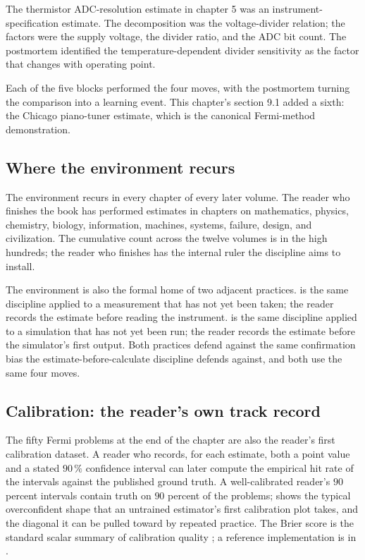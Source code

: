 The thermistor ADC-resolution estimate in chapter 5 was an
instrument-specification estimate. The decomposition was the
voltage-divider relation; the factors were the supply voltage,
the divider ratio, and the ADC bit count. The postmortem
identified the temperature-dependent divider sensitivity as the
factor that changes with operating point.

Each of the five blocks performed the four moves, with the
postmortem turning the comparison into a learning event. This
chapter's section 9.1 added a sixth: the Chicago piano-tuner
estimate, which is the canonical Fermi-method demonstration.

\subsection{Where the environment recurs}

The environment recurs in every chapter of every later volume. The
reader who finishes the book has performed estimates in chapters on
mathematics, physics, chemistry, biology, information, machines,
systems, failure, design, and civilization. The cumulative count
across the twelve volumes is in the high hundreds; the reader who
finishes has the internal ruler the discipline aims to install.

The environment is also the formal home of two adjacent practices.
 is the same discipline applied to
a measurement that has not yet been taken; the reader records the
estimate before reading the instrument.  is the same discipline applied to a simulation that has
not yet been run; the reader records the estimate before the
simulator's first output. Both practices defend against the same
confirmation bias the estimate-before-calculate discipline
defends against, and both use the same four moves.

\subsection{Calibration: the reader's own track record}

The fifty Fermi problems at the end of the chapter are also the
reader's first calibration dataset. A reader who records, for each
estimate, both a point value and a stated $90\,\%$ confidence
interval can later compute the empirical hit rate of the intervals
against the published ground truth. A well-calibrated reader's $90$
percent intervals contain truth on $90$ percent of the problems;
 shows the typical
overconfident shape that an untrained estimator's first calibration
plot takes, and the diagonal it can be pulled toward by repeated
practice. The Brier score is the standard scalar summary of
calibration quality \cite{paper:ch09-brier-1950}; a reference
implementation is in
.

